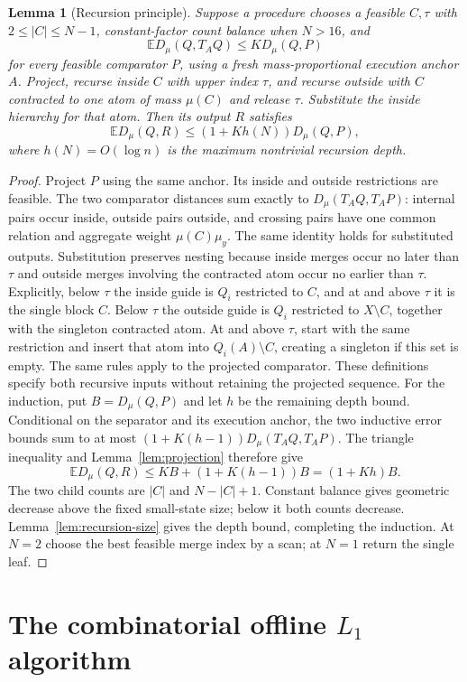 \documentclass[11pt]{article}
\newtheorem{lemma}[theorem]{Lemma}
\theoremstyle{definition}
\newcommand{\E}{\mathbb E}
\begin{document}
\begin{lemma}[Recursion principle]\label{lem:l1-recursion}
Suppose a procedure chooses a feasible $C,\tau$ with
$2\le|C|\le N-1$, constant-factor count balance when $N>16$, and
\[
 \E D_\mu(Q,T_AQ)\le K D_\mu(Q,P)
\]
for every feasible comparator $P$, using a fresh mass-proportional
execution anchor $A$. Project, recurse inside $C$ with upper index $\tau$,
and recurse outside with $C$ contracted to one atom of mass $\mu(C)$
and release $\tau$. Substitute the inside hierarchy for that atom.
Then its output $R$ satisfies
\[
 \E D_\mu(Q,R)\le(1+Kh(N))D_\mu(Q,P),
\]
where $h(N)=O(\log n)$ is the maximum nontrivial recursion depth.
\end{lemma}
\begin{proof}
Project $P$ using the same anchor. Its inside and outside restrictions
are feasible. The two comparator distances sum exactly to
$D_\mu(T_AQ,T_AP)$: internal pairs occur inside, outside pairs outside,
and crossing pairs have one common relation and aggregate weight
$\mu(C)\mu_y$. The same identity holds for substituted outputs.
Substitution preserves nesting because inside merges occur no later
than $\tau$ and outside merges involving the contracted atom occur no
earlier than $\tau$.
Explicitly, below $\tau$ the inside guide is $Q_i$ restricted to $C$,
and at and above $\tau$ it is the single block $C$. Below $\tau$ the
outside guide is $Q_i$ restricted to $X\setminus C$, together with
the singleton contracted atom. At and above $\tau$, start with the
same restriction and insert that atom into $Q_i(A)\setminus C$,
creating a singleton if this set is empty.
The same rules apply to the projected comparator. These definitions
specify both recursive inputs without retaining the projected sequence.
For the induction, put $B=D_\mu(Q,P)$ and let $h$ be the remaining
depth bound. Conditional on the separator and its execution anchor,
the two inductive error bounds sum to at most
$(1+K(h-1))D_\mu(T_AQ,T_AP)$. The triangle inequality and
Lemma~\ref{lem:projection} therefore give
\[
 \E D_\mu(Q,R)
 \le KB+(1+K(h-1))B=(1+Kh)B.
\]
The two child counts are $|C|$ and $N-|C|+1$. Constant balance gives
geometric decrease above the fixed small-state size; below it both
counts decrease. Lemma~\ref{lem:recursion-size} gives the depth bound,
completing the induction.
At $N=2$ choose the best feasible merge index
by a scan; at $N=1$ return the single leaf.
\end{proof}



\section{The combinatorial offline \texorpdfstring{$L_1$}{L1} algorithm}
\label{sec:slow}
\end{document}
